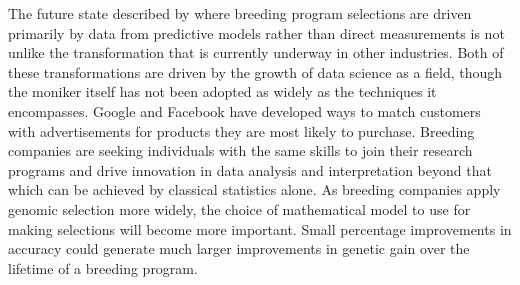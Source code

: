 The future state described by \citet{heffner2009} where breeding program
selections are driven primarily by data from predictive models rather than
direct measurements is not unlike the transformation that is currently
underway in other industries. Both of these transformations are driven by the 
growth of data science as a field, though the moniker itself has not
been adopted as widely as the techniques it encompasses.
Google and Facebook have developed ways to match customers with advertisements for products they are 
most likely to purchase. Breeding companies are seeking individuals with the same skills to
join their research programs and drive innovation in data analysis and
interpretation beyond that which can be achieved by classical statistics
alone. As breeding companies apply genomic selection more widely, the choice of 
mathematical model to use for making selections will become more important. 
Small percentage improvements in accuracy could generate much larger
improvements in genetic gain over the lifetime of a breeding program.



